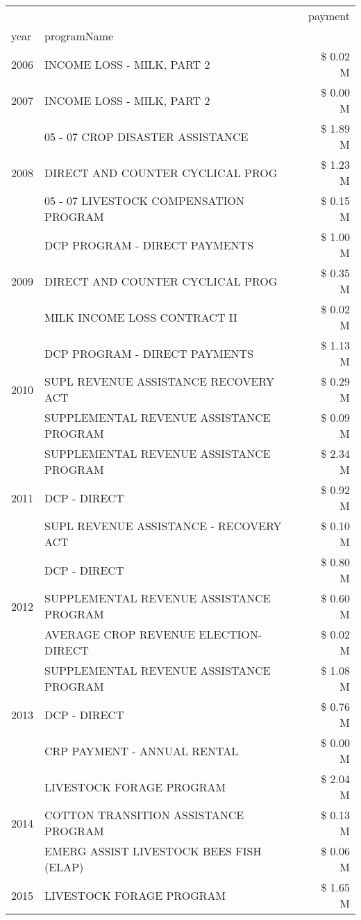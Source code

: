 \begin{tabular}{llr}
\toprule
 &  & payment \\
year & programName &  \\
\midrule
2006 & INCOME LOSS - MILK, PART 2 & \$ 0.02 M \\
\cline{1-3}
2007 & INCOME LOSS - MILK, PART 2 & \$ 0.00 M \\
\cline{1-3}
\multirow[t]{3}{*}{2008} & 05 - 07 CROP DISASTER ASSISTANCE & \$ 1.89 M \\
 & DIRECT AND COUNTER CYCLICAL PROG & \$ 1.23 M \\
 & 05 - 07 LIVESTOCK COMPENSATION PROGRAM & \$ 0.15 M \\
\cline{1-3}
\multirow[t]{3}{*}{2009} & DCP PROGRAM - DIRECT PAYMENTS & \$ 1.00 M \\
 & DIRECT AND COUNTER CYCLICAL PROG & \$ 0.35 M \\
 & MILK INCOME LOSS CONTRACT II & \$ 0.02 M \\
\cline{1-3}
\multirow[t]{3}{*}{2010} & DCP PROGRAM - DIRECT PAYMENTS & \$ 1.13 M \\
 & SUPL REVENUE ASSISTANCE RECOVERY ACT & \$ 0.29 M \\
 & SUPPLEMENTAL REVENUE ASSISTANCE PROGRAM & \$ 0.09 M \\
\cline{1-3}
\multirow[t]{3}{*}{2011} & SUPPLEMENTAL REVENUE ASSISTANCE PROGRAM & \$ 2.34 M \\
 & DCP - DIRECT & \$ 0.92 M \\
 & SUPL REVENUE ASSISTANCE - RECOVERY ACT & \$ 0.10 M \\
\cline{1-3}
\multirow[t]{3}{*}{2012} & DCP - DIRECT & \$ 0.80 M \\
 & SUPPLEMENTAL REVENUE ASSISTANCE PROGRAM & \$ 0.60 M \\
 & AVERAGE CROP REVENUE ELECTION-DIRECT & \$ 0.02 M \\
\cline{1-3}
\multirow[t]{3}{*}{2013} & SUPPLEMENTAL REVENUE ASSISTANCE PROGRAM & \$ 1.08 M \\
 & DCP - DIRECT & \$ 0.76 M \\
 & CRP PAYMENT - ANNUAL RENTAL & \$ 0.00 M \\
\cline{1-3}
\multirow[t]{3}{*}{2014} & LIVESTOCK FORAGE PROGRAM & \$ 2.04 M \\
 & COTTON TRANSITION ASSISTANCE PROGRAM & \$ 0.13 M \\
 & EMERG ASSIST LIVESTOCK BEES FISH (ELAP) & \$ 0.06 M \\
\cline{1-3}
\multirow[t]{3}{*}{2015} & LIVESTOCK FORAGE PROGRAM & \$ 1.65 M \\

\end{tabular}

